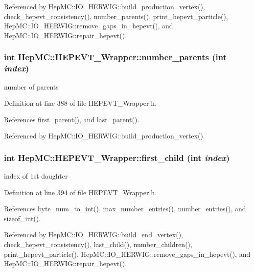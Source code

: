 Referenced by Hep\-MC::IO\_\-HERWIG::build\_\-production\_\-vertex(), check\_\-hepevt\_\-consistency(), number\_\-parents(), print\_\-hepevt\_\-particle(), Hep\-MC::IO\_\-HERWIG::remove\_\-gaps\_\-in\_\-hepevt(), and Hep\-MC::IO\_\-HERWIG::repair\_\-hepevt().
\subsubsection{\setlength{\rightskip}{0pt plus 5cm}int Hep\-MC::HEPEVT\_\-Wrapper::number\_\-parents (int {\em index})\hspace{0.3cm}{\tt  [inline, static]}}\label{classHepMC_1_1HEPEVT__Wrapper_b3c2eba5e08d497d5397a1df76347309}


number of parents 



Definition at line 388 of file HEPEVT\_\-Wrapper.h.

References first\_\-parent(), and last\_\-parent().

Referenced by Hep\-MC::IO\_\-HERWIG::build\_\-production\_\-vertex().
\subsubsection{\setlength{\rightskip}{0pt plus 5cm}int Hep\-MC::HEPEVT\_\-Wrapper::first\_\-child (int {\em index})\hspace{0.3cm}{\tt  [inline, static]}}\label{classHepMC_1_1HEPEVT__Wrapper_86faac133d2c259fec6ee6c1269f379f}


index of 1st daughter 



Definition at line 394 of file HEPEVT\_\-Wrapper.h.

References byte\_\-num\_\-to\_\-int(), max\_\-number\_\-entries(), number\_\-entries(), and sizeof\_\-int().

Referenced by Hep\-MC::IO\_\-HERWIG::build\_\-end\_\-vertex(), check\_\-hepevt\_\-consistency(), last\_\-child(), number\_\-children(), print\_\-hepevt\_\-particle(), Hep\-MC::IO\_\-HERWIG::remove\_\-gaps\_\-in\_\-hepevt(), and Hep\-MC::IO\_\-HERWIG::repair\_\-hepevt().
